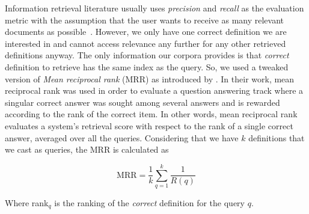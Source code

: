 Information retrieval literature usually uses \emph{precision} and \emph{recall} as the evaluation metric with the assumption that the user wants to receive as many relevant documents as possible~\cite{salton_state_1992}.
However, we only have one correct definition we are interested in and cannot access relevance any further for any other retrieved definitions anyway.
The only information our corpora provides is that \emph{correct} definition to retrieve has the same index as the query.
So, we used a tweaked version of \emph{Mean reciprocal rank} (MRR) as introduced by \textcite{voorhees_trec-8_1999}.
In their work, mean reciprocal rank was used in order to evaluate a question answering track where a singular correct answer was sought among several answers and is rewarded according to the rank of the correct item.
In other words, mean reciprocal rank evaluates a system's retrieval score with respect to the rank of a single correct answer, averaged over all the queries.
Considering that we have $k$ definitions that we cast as queries, the MRR is calculated as

\begin{equation}
    \text{MRR} = \frac{1}{k} \sum_{q = 1}^{k} \frac{1}{R(q)}
\end{equation}

Where rank$_q$ is the ranking of the \emph{correct} definition for the query $q$.

